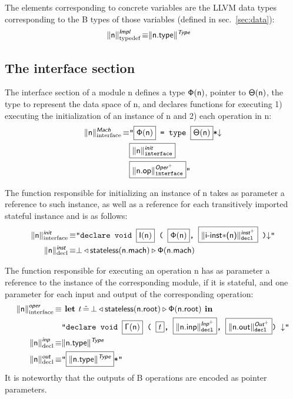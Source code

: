 \documentclass{article}
\newcommand{\trad}[2]{\ensuremath{\lVert \textsf{#1} \rVert^{\textit{#2}}}}
\newcommand{\nl}[0]{\ensuremath{\downarrow}}
\DeclareMathOperator{\isdef}{\equiv}
\newcommand{\llvm}[1]{\texttt{#1}}
\newcommand{\B}[1]{\textsf{#1}}
\newcommand{\ListOf}[1]{$\mbox{#1}^+$}
\newcommand{\LET}[0]{\textbf{ let }}
\DeclareMathOperator{\BE}{\hat{=}}
\newcommand{\IN}[0]{\textbf{ in }}
\newcommand{\PH}[1]{\framebox{$#1$}}
\newcommand{\Global}[0]{\ensuremath{\sf\Gamma}}
\newcommand{\stateless}[0]{\ensuremath{\textsf{stateless}}}
\newcommand{\trimportedinstances}[0]{\ensuremath{\textsf{i-inst$\mathsf{\ast}$}}}
\newcommand{\state}[0]{\ensuremath{\sf\Theta}}
\newcommand{\stateref}[0]{\ensuremath{\sf\Phi}}
\newcommand{\init}[0]{\ensuremath{\mathsf{I}}}
\begin{document}
The elements corresponding to concrete variables are the LLVM data types
corresponding to the B types of those variables (defined in
sec.~\ref{sec:data}):
\begin{align*}
  \trad{\B{n}}{\B{Impl}}_{\text{typedef}} \isdef
  & \trad{\B{n.type}}{\B{Type}}
\end{align*}

\subsection{The interface section}

The interface section of a module \B{n} defines a type $\stateref(\B{n})$,
pointer to $\state(\B{n})$, the type to represent the data space of \B{n}, and
declares functions for executing 1) executing the initialization of an instance
of \B{n} and 2) each operation in \B{n}:
\begin{align*}
  \trad{\B{n}}{\B{Mach}}_{\text{interface}} \isdef
  & \llvm{"\PH{\stateref(\B{n})} = type \PH{\state(\B{n})}*\nl} \\
  & \llvm{\PH{\trad{\B{n}}{\B{init}}_{\text{interface}}}}\\
  & \llvm{\PH{\trad{\B{n.op}}{\ListOf{\B{Oper}}}_{\text{interface}}}"}
\end{align*}

The function responsible for initializing an instance of \B{n} takes as
parameter a reference to such instance, as well as a reference for each
transitively imported stateful instance and is as follows:
\begin{align*}
  \trad{\B{n}}{\B{init}}_{\text{interface}} \isdef
  & \llvm{"declare void \PH{\init(\B{n})} ( \PH{\stateref(\B{n})},
    \PH{\trad{\trimportedinstances(\B{n})}{\ListOf{\B{inst}}}_{\text{decl}}} )\nl"} \\
  \trad{\B{n}}{\B{inst}}_{\text{decl}} \isdef
  & \bot \triangleleft \stateless(\B{n.mach}) \triangleright \stateref(\B{n.mach})
\end{align*}

The function responsible for executing an operation \B{n} has as parameter a
reference to the instance of the corresponding module, if it is stateful, and
one parameter for each input and output of the corresponding operation:
\begin{align*}
  \trad{\B{n}}{\B{oper}}_{\text{interface}} \isdef
  &
\LET t \BE \bot \triangleleft \stateless(\B{n.root}) \triangleright \stateref(\B{n.root}) \IN \\
& \llvm{"declare void \PH{\Global(\B{n})}
( \PH{t},
  \PH{\trad{\B{n.inp}}{\ListOf{\B{Inp}}}_{\text{decl}}},
  \PH{\trad{\B{n.out}}{\ListOf{\B{Out}}}_{\text{decl}}}) \nl"} \\
  \trad{\B{n}}{\B{inp}}_{\text{decl}} \isdef & \trad{\B{n.type}}{\B{Type}} \\
  \trad{\B{n}}{\B{out}}_{\text{decl}} \isdef & \llvm{"\PH{\trad{\B{n.type}}{\B{Type}}}*"}
\end{align*}
It is noteworthy that the outputs of B operations are encoded as pointer
parameters.
\end{document}
